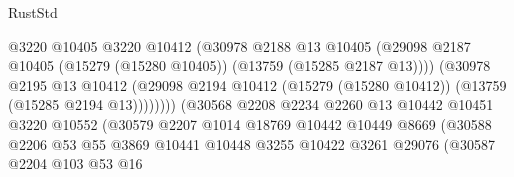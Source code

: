 \begin{lexlean}{RustStd}
\begin{coremodule}
                                          @3220
                                          @10405
                                          @3220
                                          @10412
                                          (@30978
                                            @2188
                                            @13
                                            @10405
                                            (@29098
                                              @2187
                                              @10405
                                              (@15279 (@15280 @10405))
                                              (@13759 (@15285 @2187 @13))))
                                          (@30978
                                            @2195
                                            @13
                                            @10412
                                            (@29098
                                              @2194
                                              @10412
                                              (@15279 (@15280 @10412))
                                              (@13759 (@15285 @2194 @13))))))))
                                  (@30568
                                    @2208
                                    @2234
                                    @2260
                                    @13
                                    @10442
                                    @10451
                                    @3220
                                    @10552
                                    (@30579
                                      @2207
                                      @1014
                                      @18769
                                      @10442
                                      @10449
                                      @8669
                                      (@30588
                                        @2206
                                        @53
                                        @55
                                        @3869
                                        @10441
                                        @10448
                                        @3255
                                        @10422
                                        @3261
                                        @29076
                                        (@30587
                                          @2204
                                          @103
                                          @53
                                          @16

\end{coremodule}
\end{lexlean}
